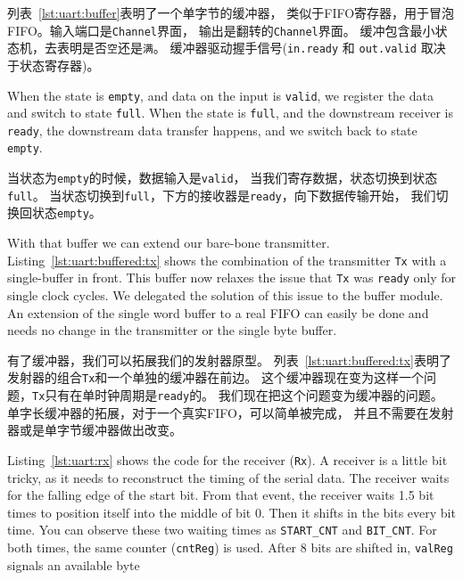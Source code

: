 \documentclass[%
    10pt,
    headinclude, footexclude,
    openright, %
    notitlepage,
    cleardoubleempty,
    headsepline,
    pointlessnumbers,
    bibtotoc, idxtotoc,
    ]{scrbook}
\newcommand{\code}[1]{{\small{\texttt{#1}}}}
\begin{document}
列表~\ref{lst:uart:buffer}表明了一个单字节的缓冲器，
类似于FIFO寄存器，用于冒泡FIFO。输入端口是\code{Channel}界面，
输出是翻转的\code{Channel}界面。
缓冲包含最小状态机，去表明是否\code{空}还是\code{满}。
缓冲器驱动握手信号(\code{in.ready} 和 \code{out.valid} 取决于状态寄存器)。

When the state is \code{empty}, and data on the input is \code{valid},
we register the data and switch to state \code{full}.
When the state is \code{full}, and the downstream receiver is
\code{ready}, the downstream data transfer happens, and we switch
back to state \code{empty}.

当状态为\code{empty}的时候，数据输入是\code{valid}，
当我们寄存数据，状态切换到状态\code{full}。
当状态切换到\code{full}，下方的接收器是\code{ready}，向下数据传输开始，
我们切换回状态\code{empty}。

With that buffer we can extend our bare-bone transmitter.
Listing~\ref{lst:uart:buffered:tx} shows the combination of the transmitter \code{Tx}
with a single-buffer in front. This buffer now relaxes the issue that \code{Tx}
was \code{ready} only for single clock cycles. We delegated the solution of
this issue to the buffer module.
An extension of the single word buffer to a real FIFO can easily be done
and needs no change in the transmitter or the single byte buffer.

有了缓冲器，我们可以拓展我们的发射器原型。
列表~\ref{lst:uart:buffered:tx}表明了发射器的组合\code{Tx}和一个单独的缓冲器在前边。
这个缓冲器现在变为这样一个问题，\code{Tx}只有在单时钟周期是\code{ready}的。
我们现在把这个问题变为缓冲器的问题。
单字长缓冲器的拓展，对于一个真实FIFO，可以简单被完成，
并且不需要在发射器或是单字节缓冲器做出改变。

Listing~\ref{lst:uart:rx} shows the code for the receiver (\code{Rx}).
A receiver is a little bit tricky, as it needs to reconstruct the timing of
the serial data. The receiver waits for the falling edge of the start bit.
From that event, the receiver waits 1.5 bit times to position itself into the middle
of bit 0. Then it shifts in the bits every bit time. You can observe these
two waiting times as \code{START\_CNT} and \code{BIT\_CNT}.
For both times, the same counter (\code{cntReg}) is used.
After 8 bits are shifted in, \code{valReg} signals an available byte
\end{document}
